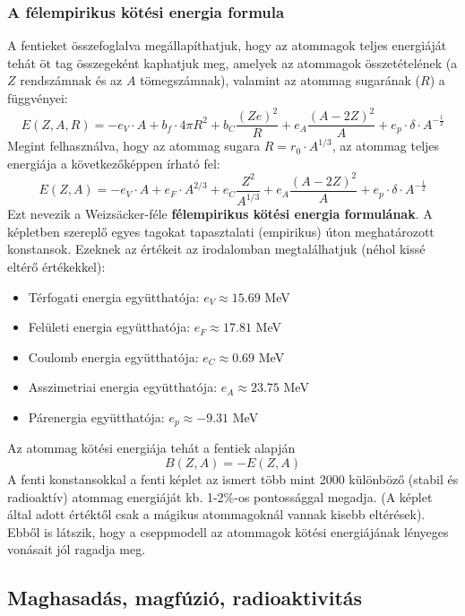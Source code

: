 \documentclass[../main.tex]{subfiles}
\begin{document}
\subsubsection{A félempirikus kötési energia formula}
A fentieket összefoglalva megállapíthatjuk, hogy az atommagok teljes energiáját tehát öt
tag összegeként kaphatjuk meg, amelyek az atommagok összetételének (a $Z$ rendszámnak
és az $A$ tömegszámnak), valamint az atommag sugarának ($R$) a függvényei:
\begin{equation}
    E(Z, A, R) = -e_V \cdot A + b_f \cdot 4 \pi R^2 + b_C \frac{(Ze)^2}{R} + e_A \frac{(A - 2Z)^2}{A} + e_p \cdot \delta \cdot A^{-\frac{1}{2}}
\end{equation}
Megint felhasználva, hogy az atommag sugara $R = r_0 \cdot A^{1/3}$, az atommag teljes energiája a következőképpen írható fel:
\begin{equation}
    \boxed{
        E(Z, A) = -e_V \cdot A + e_F \cdot A^{2/3} +  e_C \frac{Z^2}{A^{1/3}} + e_A \frac{(A - 2Z)^2}{A} + e_p \cdot \delta \cdot A^{-\frac{1}{2}}
    }
\end{equation}
Ezt nevezik a Weizsäcker-féle \textbf{félempirikus kötési energia formulának}. A képletben szereplő egyes tagokat tapasztalati (empirikus) úton meghatározott konstansok.
Ezeknek az értékeit az irodalomban megtalálhatjuk (néhol kissé eltérő értékekkel):
\begin{itemize}
    \item Térfogati energia együtthatója: $e_V \approx 15.69$ MeV
    \item Felületi energia együtthatója: $e_F \approx 17.81$ MeV
    \item Coulomb energia együtthatója: $e_C \approx 0.69$ MeV
    \item Asszimetriai energia együtthatója: $e_A \approx 23.75$ MeV
    \item Párenergia együtthatója: $e_p \approx -9.31$ MeV
\end{itemize}
Az atommag kötési energiája tehát a fentiek alapján
\begin{equation}
    B(Z, A) = - E(Z, A)
\end{equation}
A fenti konstansokkal a fenti képlet az ismert több mint 2000 különböző (stabil és radioaktív)
atommag energiáját kb. 1-2\%-os pontossággal megadja. (A képlet által adott értéktől csak a mágikus atommagoknál vannak kisebb eltérések). Ebből is látszik, hogy a
cseppmodell az atommagok kötési energiájának lényeges vonásait jól ragadja meg. 

\subsection{Maghasadás, magfúzió, radioaktivitás}
\end{document}
